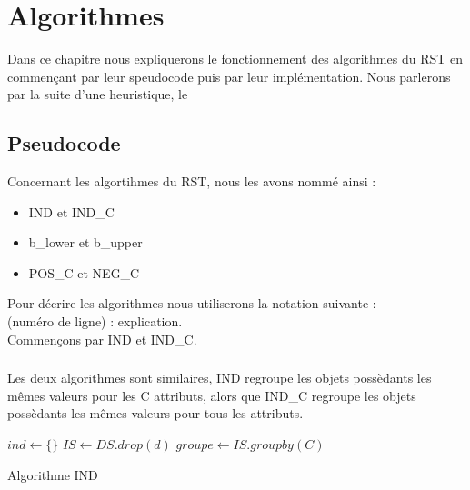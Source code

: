\section{Algorithmes}
Dans ce chapitre nous expliquerons le fonctionnement des algorithmes
du RST en commençant par leur speudocode puis par leur
implémentation. Nous parlerons par la suite d'une heuristique, le
\quickreduct

\subsection{Pseudocode}
Concernant les algortihmes du RST, nous les avons nommé ainsi :
\begin{itemize}
	\item IND et IND\_C
	\item b\_lower et b\_upper
	\item POS\_C et NEG\_C
\end{itemize}
Pour décrire les algorithmes nous utiliserons la notation suivante : \\
(numéro de ligne) : explication. \\
Commençons par IND et IND\_C.
\subsubsection{\ind}
Les deux algorithmes sont similaires, IND regroupe les objets possèdants
les mêmes valeurs pour les C attributs, alors que IND\_C regroupe
les objets possèdants les mêmes valeurs pour tous les attributs.
\begin{algorithm}[h!]
	\SetAlgoLined
	\LinesNumbered
	$ind \gets \{\}$ \;
	$IS \gets DS.drop(d)$ \;
	$groupe \gets IS.groupby(C)$ \;
	\caption{Algorithme IND}
\end{algorithm}

